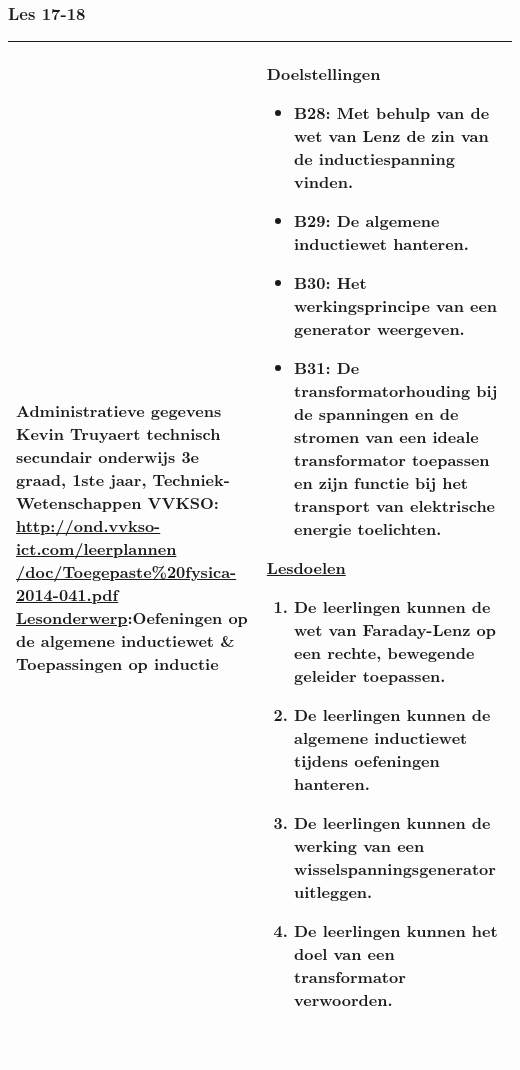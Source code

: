 


\begin{landscape}
	\subsubsection{Les 17-18}
	\begin{tabularx}{1.56\textwidth}{|p{}|X|}\hline
		\textbf{Administratieve gegevens}\newline\newline
		Kevin Truyaert\newline\newline
		technisch secundair onderwijs\newline
		3e graad, 1ste jaar, Techniek-Wetenschappen\newline
		VVKSO: \href{http://ond.vvkso-ict.com/leerplannen/doc/Toegepaste\%20fysica-2014-041.pdf}{http://ond.vvkso-ict.com/leerplannen /doc/Toegepaste\%20fysica-2014-041.pdf} \newline
		\underline{Lesonderwerp}:\newline Oefeningen op de algemene inductiewet \& Toepassingen op inductie & \textbf{Doelstellingen}
		\begin{itemize}[itemsep=0.08\baselineskip]
			\item B28: Met behulp van de wet van Lenz de zin van de inductiespanning vinden.
			\item B29: De algemene inductiewet hanteren.
			\item B30: Het werkingsprincipe van een generator weergeven.
			\item B31: De transformatorhouding bij de spanningen en de stromen van een ideale transformator toepassen en zijn functie bij het transport van elektrische energie toelichten.
		\end{itemize}
		\underline{Lesdoelen}\newline
		\vspace{-0.75cm}
		\begin{enumerate}[itemsep=0.08\baselineskip]
			\item De leerlingen kunnen de wet van Faraday-Lenz op een rechte, bewegende geleider toepassen.
			\item De leerlingen kunnen de algemene inductiewet tijdens oefeningen hanteren.
			\item De leerlingen kunnen de werking van een wisselspanningsgenerator uitleggen.
			\item De leerlingen kunnen het doel van een transformator verwoorden.
		\end{enumerate} \\\hline
	\end{tabularx}\vfill \textcolor{white}{.} 



\end{landscape}

